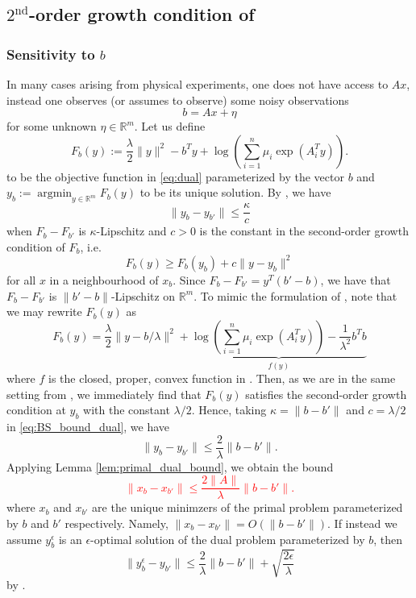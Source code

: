 \documentclass[10pt,a4paper]{article}
\numberwithin{equation}{section}
\theoremstyle{definition}
\def\rr{{\mathbb R}}
\DeclareMathOperator{\argmin}{argmin}
\begin{document}
\subsection{$2^\text{nd}$-order growth condition of \cite{Bonnans2000}}

\subsubsection{Sensitivity to $b$}


In many cases arising from physical experiments, one does not have access to $Ax$, instead one observes (or assumes to observe) some noisy observations
\[
b = Ax + \eta
\]
for some unknown $\eta \in \rr^m$. Let us define 
\[
F_b(y) :=  \frac{\lambda}{2} \lVert y \rVert^2 - b^Ty +  \log \left(\sum_{i=1}^n \mu_i \exp(A_i^T y)\right).
\]
to be the objective function in \eqref{eq:dual} parameterized by the vector $b$ and $y_b := \argmin_{y \in \rr^m}F_b(y)$ to be its unique solution. By \cite[Proposition 4.32]{Bonnans2000}, we have
\begin{equation}\label{eq:BS_bound_dual}
\lVert y_b - y_{b'}\lVert \leq \frac{\kappa}{c} 
\end{equation}
when $F_b - F_{b'}$ is $\kappa$-Lipschitz and $c>0$ is the constant in the second-order growth condition of $F_b$, i.e. 
\[
F_b(y) \geq F_b(y_b) + c \lVert y - y_b \rVert^2
\]
for all $x$ in a neighbourhood of $x_b$. Since $F_b - F_{b'} = y^T(b'-b)$, we have that  $F_b - F_{b'}$ is $\lVert b' - b \rVert$-Lipschitz on $\rr^m$. To mimic the formulation of \cite[Example 4.33]{Bonnans2000}, note that we may rewrite $F_b(y)$ as 
\[
F_b(y) =  \frac{\lambda}{2} \lVert y - b/\lambda \rVert^2 +  \underbrace{\log \left(\sum_{i=1}^n \mu_i \exp(A_i^T y)\right) - \frac{1}{\lambda^2}b^Tb}_{f(y)}
\]
where $f$ is the closed, proper, convex function in \cite[Example 4.33]{Bonnans2000}. Then, as we are in the same setting from \cite[Example 4.33]{Bonnans2000}, we immediately find that $F_b(y)$ satisfies the second-order growth condition at $y_b$ with the constant $\lambda / 2$. Hence, taking $\kappa = \lVert b - b'\rVert$ and $c = \lambda / 2$ in \eqref{eq:BS_bound_dual}, we have
\[
\lVert y_b - y_{b'}\lVert \leq \frac{2}{\lambda} \lVert b - b'\rVert.
\]
Applying Lemma \ref{lem:primal_dual_bound}, we obtain the bound
\textcolor{red}{
\[
\lVert x_b - x_{b'}\lVert \leq \frac{2\lVert A \rVert}{\lambda} \lVert b - b'\rVert.
\]
}
where $x_b$ and $x_{b'}$ are the unique minimzers of the primal problem parameterized by $b$ and $b'$ respectively. Namely, $\lVert x_b - x_{b'}\lVert = O(\lVert b - b' \rVert)$. If instead we assume $y_b^{\epsilon}$ is an $\epsilon$-optimal solution of the dual problem parameterized by $b$, then 
\[
\lVert y_b^\epsilon - y_{b'}\lVert \leq \frac{2}{\lambda} \lVert b - b'\rVert + \sqrt{\frac{2 \epsilon}{\lambda}}
\]
by \cite[Proposition 4.32]{Bonnans2000}.
\end{document}
